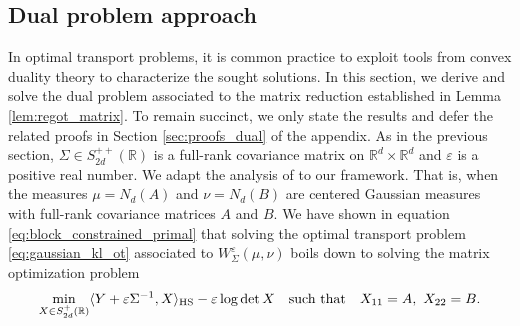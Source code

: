 \documentclass[]{article}
\numberwithin{equation}{section}
\theoremstyle{plain}
\begin{document}
\subsection{Dual problem approach}\label{sec:dual_problem}
In optimal transport problems, it is common practice to exploit tools from convex duality theory to characterize the sought solutions. In this section, we derive and solve the dual problem associated to the matrix reduction established in Lemma \ref{lem:regot_matrix}. To remain succinct, we only state the results and defer the related proofs in Section \ref{sec:proofs_dual} of the appendix. As in the previous section, $\Sigma \in S_{2d}^{++}(\mathbb{R})$ is a full-rank covariance matrix on $\mathbb{R}^d \times \mathbb{R}^d$ and $\varepsilon$ is a positive real number. We adapt the analysis of \citep[p.~26]{villani2021topics} to our framework. That is, when the measures $\mu = N_d(A)$ and $\nu = N_d(B)$ are centered Gaussian measures with full-rank covariance matrices $A$ and $B$.  We have shown in equation \eqref{eq:block_constrained_primal} that solving the optimal transport problem \eqref{eq:gaussian_kl_ot} associated to $W_\Sigma^\varepsilon(\mu, \nu)$ boils down to solving the matrix optimization problem
\begin{equation}\label{eq:dual_start_comput}
      \min_{X \in S_{2d}^+(\mathbb{R})}\langle Y + \varepsilon \Sigma^{-1}, X \rangle_{\rm HS} -  \varepsilon \log \det X \quad \text{such that} \quad X_{11} = A,~ X_{22} = B.
\end{equation}
\end{document}

